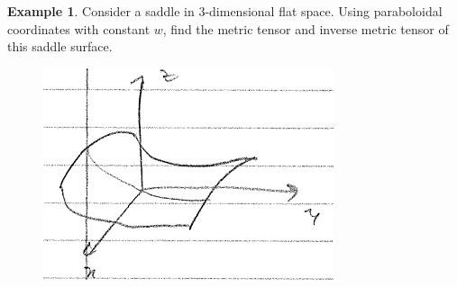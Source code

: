 \documentclass{book}
\theoremstyle{definition}
\newtheorem{exmp}{Example}[section]
\begin{document}
\begin{exmp}
	Consider a saddle in 3-dimensional flat space. Using paraboloidal coordinates with constant $w$, find the metric tensor and inverse metric tensor of this saddle surface.
	
	\begin{figure}[!htb]
		\centering
		\includegraphics[scale=0.6]{saddle}
	\end{figure}
	

\end{exmp}
\end{document}
